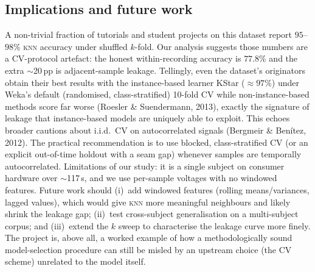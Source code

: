 \documentclass[11pt]{article}
\newcommand{\pp}{\,pp}          %
\newcommand{\knn}{\textsc{knn}}
\begin{document}
\subsection{Implications and future work}
A non-trivial fraction of tutorials and student projects on this dataset
report $95$--$98\%$ \knn{} accuracy under shuffled $k$-fold. Our analysis
suggests those numbers are a CV-protocol artefact: the honest
within-recording accuracy is $77.8\%$ and the extra $\sim$20\pp{} is
adjacent-sample leakage. Tellingly, even the dataset's originators obtain
their best results with the instance-based learner KStar ($\approx 97\%$)
under Weka's default (randomised, class-stratified) 10-fold CV while
non-instance-based methods score far worse
(Roesler \& Suendermann, 2013), exactly the signature of leakage that
instance-based models are uniquely able to exploit. This echoes
broader cautions about i.i.d.\ CV on autocorrelated signals (Bergmeir \&
Ben\'itez, 2012). The practical recommendation is to use blocked,
class-stratified CV (or an explicit out-of-time holdout with a seam gap)
whenever samples are temporally autocorrelated. Limitations of our study:
it is a single subject on consumer hardware over $\sim$117\,s, and we use
per-sample voltages with no windowed features. Future work should (i)~add
windowed features (rolling means/variances, lagged values), which would
give \knn{} more meaningful neighbours and likely shrink the leakage gap;
(ii)~test cross-subject generalisation on a multi-subject corpus; and
(iii)~extend the $k$ sweep to characterise the leakage curve more finely.
The project is, above all, a worked example of how a methodologically sound
model-selection procedure can still be misled by an upstream choice (the
CV scheme) unrelated to the model itself.

\end{document}
